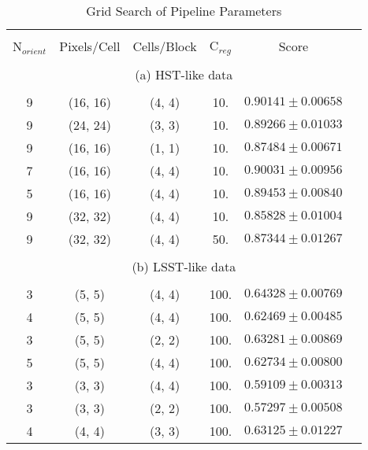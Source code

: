 \documentclass{emulateapj}
\begin{document}
\begin{table}
\caption{Grid Search of Pipeline Parameters}
\begin{center}
\begin{tabular}{cccccc}
\hline \\ [-0.2cm]
N$_{orient}$ & Pixels/Cell & Cells/Block & C$_{reg}$ & Score & \\ [0.2cm]
\hline \\ [-0.2cm]
\multicolumn{6}{c}{(a) HST-like data} \\ [0.2cm]
\hline \\ [-0.2cm]
9 & (16, 16) & (4, 4) & 10. & $0.90141\pm 0.00658$ &\\ [0.2cm]
9 & (24, 24) & (3, 3) & 10. & $0.89266\pm 0.01033$ &\\ [0.2cm]
9 & (16, 16) & (1, 1) & 10. & $0.87484\pm 0.00671$ &\\ [0.2cm]
7 & (16, 16) & (4, 4) & 10. & $0.90031\pm 0.00956$ &\\ [0.2cm]
5 & (16, 16) & (4, 4) & 10. & $0.89453\pm 0.00840$ &\\ [0.2cm]
9 & (32, 32) & (4, 4) & 10. & $0.85828\pm 0.01004$ &\\ [0.2cm]
9 & (32, 32) & (4, 4) & 50. & $0.87344\pm 0.01267$ &\\ [0.2cm]
\hline \\ [-0.2cm]
\multicolumn{6}{c}{(b) LSST-like data} \\ [0.2cm]
\hline \\ [-0.2cm]
3 & (5, 5) & (4, 4) & 100. & $0.64328\pm 0.00769$ &\\ [0.2cm]
4 & (5, 5) & (4, 4) & 100. & $0.62469\pm 0.00485$ &\\ [0.2cm]
3 & (5, 5) & (2, 2) & 100. & $0.63281\pm 0.00869$ &\\ [0.2cm]
5 & (5, 5) & (4, 4) & 100. & $0.62734\pm 0.00800$ &\\ [0.2cm]
3 & (3, 3) & (4, 4) & 100. & $0.59109\pm 0.00313$ &\\ [0.2cm]
3 & (3, 3) & (2, 2) & 100. & $0.57297\pm 0.00508$ &\\ [0.2cm]
4 & (4, 4) & (3, 3) & 100. & $0.63125\pm 0.01227$ &\\ [0.2cm]
\hline
\end{tabular}
\end{center}
\label{tab:gridsearch}

\end{table}
\end{document}
